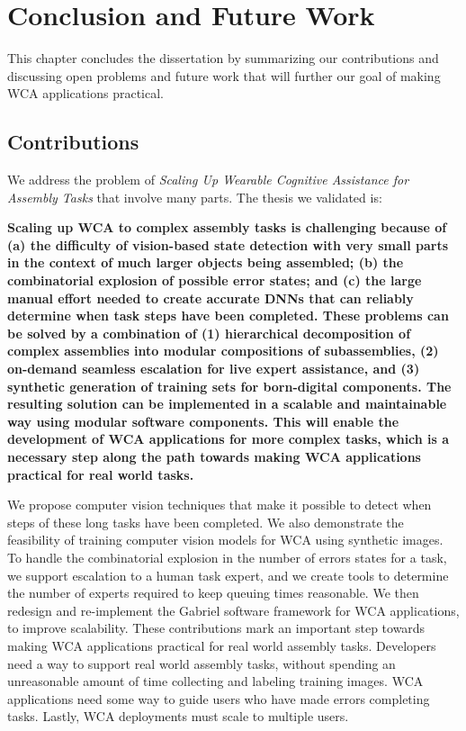 \chapter{Conclusion and Future Work}\label{chap:conclusion}

This chapter concludes the dissertation by summarizing our contributions and
discussing open problems and future work that will further our goal of making
WCA applications practical.

\section{Contributions}

We address the problem of \textit{Scaling Up Wearable Cognitive Assistance for
  Assembly Tasks} that involve many parts.
The thesis we validated is:

\textbf{
  Scaling up WCA to complex assembly tasks is challenging because of
  (a) the difficulty of
  vision-based state detection with very small parts in the context of much
  larger objects being assembled; (b) the combinatorial explosion
  of possible error states; and (c) the large manual effort needed to create
  accurate DNNs that can reliably determine when task steps have been completed.
  These problems can be solved by a combination of (1) hierarchical
  decomposition of
  complex assemblies into modular compositions of subassemblies, (2) on-demand
  seamless
  escalation for live expert assistance, and (3) synthetic generation of
  training
  sets for born-digital components. The resulting solution can be implemented in
  a scalable and maintainable way using modular software components.
  This will enable the development of WCA applications for more complex tasks,
  which is a necessary step along the path towards making WCA applications
  practical for real world tasks.
}

We propose computer vision techniques that make it possible to detect when steps
of these long tasks have been completed.
We also demonstrate the feasibility of training computer vision models for WCA
using synthetic images.
To handle the combinatorial explosion in the number of errors states for a task,
we support escalation to a human task expert, and we create tools to determine
the number of experts required to keep queuing times reasonable.
We then redesign and re-implement the Gabriel software framework for WCA
applications, to improve scalability.
These contributions mark an important step towards making WCA applications
practical for real world assembly tasks.
Developers need a way to support real world assembly tasks, without spending an
unreasonable amount of time collecting and labeling training images.
WCA applications need some way to guide users who have made errors completing
tasks.
Lastly, WCA deployments must scale to multiple users.

